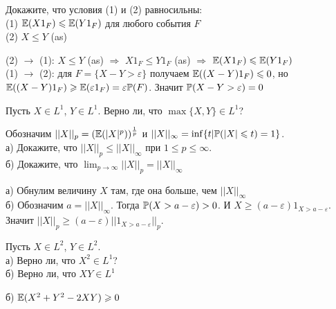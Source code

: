 \begin{problem}
Докажите, что условия (1) и (2) равносильны: \\
(1) $\E(X 1_{F})\le \E(Y 1_{F})$ для любого события $F$ \\
(2) $X\le Y$ (as) 
\end{problem} 
\begin{solution} 


(2) $\rightarrow$ (1): $X\le Y$ (as) $\Rightarrow$ $X 1_{F}\le Y
1_{F}$ (as) $\Rightarrow$ $\E(X 1_{F})\le \E(Y 1_{F})$ \\
(1) $\rightarrow$ (2): для $F=\{X-Y>\varepsilon\}$ получаем
$\E((X-Y) 1_{F})\le
 0$, но $\E((X-Y) 1_{F})\ge \E(\varepsilon 1_{F})=\varepsilon \P(F)$.
Значит $\P(X-Y>\varepsilon)=0$ 
\end{solution}

\begin{problem}
Пусть $X\in L^{1}$, $Y\in L^{1}$. Верно ли, что $\max\{X,Y\}\in
L^{1}$? 
\end{problem} 
\begin{solution} 

\end{solution}

\begin{problem}
\label{L beskonechnost} Обозначим
$||X||_{p}=(\E(|X|^{p}))^{\frac{1}{p}}$ и
$||X||_{\infty}=\inf\{t|\P(|X|\le t)=1\}$. \\
а) Докажите, что $||X||_{p}\le ||X||_{\infty}$ при $1\le p\le
\infty$. \\
б) Докажите, что $\lim_{p\to\infty}||X||_{p}=||X||_{\infty}$ 
\end{problem} 
\begin{solution} 

а) Обнулим величину $X$ там, где она больше, чем $||X||_{\infty}$ \\
б) Обозначим $a=||X||_{\infty}$. Тогда $\P(X>a-\varepsilon)>0$. И
$X\ge (a-\varepsilon)1_{X>a-\varepsilon}$. Значит $||X||_{p}\ge
(a-\varepsilon)||1_{X>a-\varepsilon}||_{p}$. 
\end{solution}

\begin{problem}
\label{X2Y2XY} Пусть $X\in L^{2}$, $Y\in L^{2}$. \\
а) Верно ли, что $X^{2}\in L^{1}$? \\
б) Верно ли, что $XY\in L^{1}$ 
\end{problem} 
\begin{solution} 

б) $\E(X^{2}+Y^{2}-2XY)\ge 0$ 
\end{solution}

